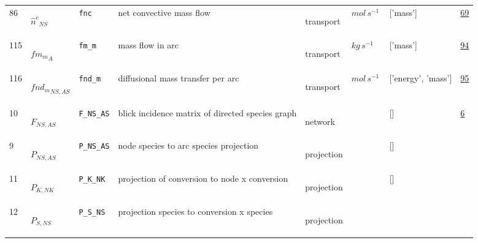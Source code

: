 \begin{longtable}{|p{1cm}|p{3cm}|p{3cm}|p{7cm}|p{3.0cm}|p{3cm}|p{2cm}|p{1cm}|}
    86
             & \hypertarget{"v:86"}{ $ {\hat{n}^{c}}_{{N S}} $}
             & \verb|fnc|
             & net convective mass flow
             & \begin{lay}transport \end{lay}
             & $ mol \,s^{-1} \, $
             & ['mass']
             & \hyperlink{"e:69"}{ 69 }
                 \\
    115
             & \hypertarget{"v:115"}{ $ {fm_m}_{A} $}
             & \verb|fm_m|
             & mass flow in arc
             & \begin{lay}transport \end{lay}
             & $ kg \,s^{-1} \, $
             & ['mass']
             & \hyperlink{"e:94"}{ 94 }
                 \\
    116
             & \hypertarget{"v:116"}{ $ {fnd_m}_{{N S}, {A S}} $}
             & \verb|fnd_m|
             & diffusional mass transfer per arc
             & \begin{lay}transport \end{lay}
             & $ mol \,s^{-1} \, $
             & ['energy', 'mass']
             & \hyperlink{"e:95"}{ 95 }
                 \\
    10
             & \hypertarget{"v:10"}{ $ {F}_{{N S}, {A S}} $}
             & \verb|F_NS_AS|
             & blick incidence matrix of directed species graph
             & \begin{lay}network \end{lay}
             & $  $
             & []
             & \hyperlink{"e:6"}{ 6 }
                 \\
    9
             & \hypertarget{"v:9"}{ $ {P}_{{N S}, {A S}} $}
             & \verb|P_NS_AS|
             & node species to arc species projection
             & \begin{lay}projection \end{lay}
             & $  $
             & []
             & \\
    11
             & \hypertarget{"v:11"}{ $ {P}_{K, {N K}} $}
             & \verb|P_K_NK|
             & projection of conversion to node x conversion
             & \begin{lay}projection \end{lay}
             & $  $
             & []
             & \\
    12
             & \hypertarget{"v:12"}{ $ {P}_{S, {N S}} $}
             & \verb|P_S_NS|
             & projection species to conversion x
species
             & \begin{lay}projection \end{lay}

\end{longtable}
